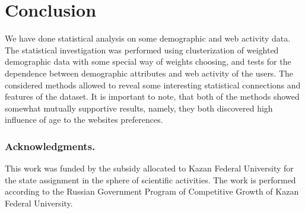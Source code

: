 \documentclass[runningheads,a4paper]{llncs}
\begin{document}
\section{Conclusion}


We have done statistical analysis on some demographic and web activity data. The statistical investigation was performed using clusterization of weighted demographic data with some special way of weights choosing, and tests for the dependence between demographic attributes and web activity of the users. The considered methods allowed to reveal some interesting statistical connections and features of the dataset. It is important to note, that both of the methods showed somewhat mutually supportive results, namely, they both discovered high influence of age to the websites preferences.


\subsubsection*{Acknowledgments.} This work was funded by the subsidy allocated to Kazan Federal University for the state assignment in the sphere of scientific activities. The work is performed according to the Russian Government Program of Competitive Growth of Kazan Federal University.
\end{document}
